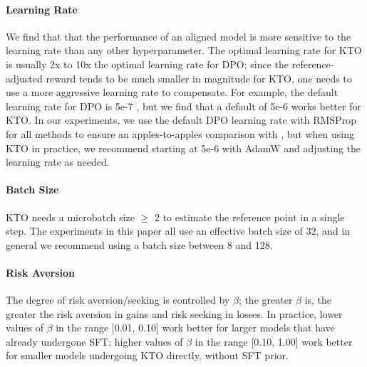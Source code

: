 \paragraph{Learning Rate} 
We find that that the performance of an aligned model is more sensitive to the learning rate than any other hyperparameter.
The optimal learning rate for KTO is usually 2x to 10x the optimal learning rate for DPO; since the reference-adjusted reward tends to be much smaller in magnitude for KTO, one needs to use a more aggressive learning rate to compensate.
For example, the default learning rate for DPO is 5e-7 \citep{rafailov2023direct}, but we find that a default of 5e-6 works better for KTO.
In our experiments, we use the default DPO learning rate with RMSProp for all methods to ensure an apples-to-apples comparison with \citet{rafailov2023direct}, but when using KTO in practice, we recommend starting at 5e-6 with AdamW and adjusting the learning rate as needed.

\paragraph{Batch Size} KTO needs a microbatch size $\geq$ 2 to estimate the reference point in a single step.
The experiments in this paper all use an effective batch size of 32, and in general we recommend using a batch size between 8 and 128.

\paragraph{Risk Aversion} 
The degree of risk aversion/seeking is controlled by $\beta$; the greater $\beta$ is, the greater the risk aversion in gains and risk seeking in losses.
In practice, lower values of $\beta$ in the range [0.01, 0.10] work better for larger models that have already undergone SFT; higher values of $\beta$ in the range [0.10, 1.00] work better for smaller models undergoing KTO directly, without SFT prior.

